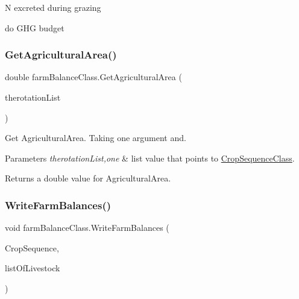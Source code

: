 N excreted during grazing

do G\+HG budget \mbox{\label{classfarm_balance_class_ac063d274bba3a3c59fd0fafc621f21f1}} 
\subsubsection{\texorpdfstring{GetAgriculturalArea()}{GetAgriculturalArea()}}
{\footnotesize\ttfamily double farm\+Balance\+Class.\+Get\+Agricultural\+Area (\begin{DoxyParamCaption}\item[{List$<$ \mbox{\hyperlink{class_crop_sequence_class}{Crop\+Sequence\+Class}} $>$}]{therotation\+List }\end{DoxyParamCaption})\hspace{0.3cm}{\ttfamily [inline]}}



Get Agricultural\+Area. Taking one argument and. 


\begin{DoxyParams}{Parameters}
{\em therotation\+List,one} & list value that points to \mbox{\hyperlink{class_crop_sequence_class}{Crop\+Sequence\+Class}}. \\
\hline
\end{DoxyParams}
\begin{DoxyReturn}{Returns}
a double value for Agricultural\+Area. 
\end{DoxyReturn}
\mbox{\label{classfarm_balance_class_a9642194e0cc01493c3446ecbdbed78c4}} 
\subsubsection{\texorpdfstring{WriteFarmBalances()}{WriteFarmBalances()}}
{\footnotesize\ttfamily void farm\+Balance\+Class.\+Write\+Farm\+Balances (\begin{DoxyParamCaption}\item[{List$<$ \mbox{\hyperlink{class_crop_sequence_class}{Crop\+Sequence\+Class}} $>$}]{Crop\+Sequence,  }\item[{List$<$ \mbox{\hyperlink{classlivestock}{livestock}} $>$}]{list\+Of\+Livestock }\end{DoxyParamCaption})\hspace{0.3cm}{\ttfamily [inline]}}



